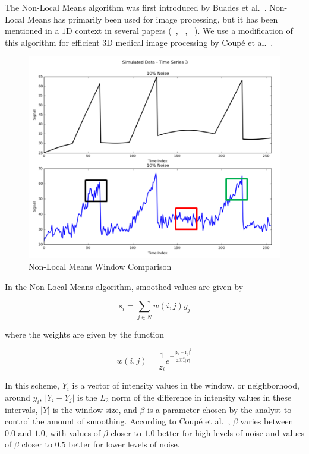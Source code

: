 \documentclass[11pt]{article}
\theoremstyle{definition}
\begin{document}
The Non-Local Means algorithm was first introduced by Buades et al.~\cite{Buades05}. Non-Local Means has primarily been used for image processing, but it has been mentioned in a $1$D context in several papers (~\cite{Galiano13}, ~\cite{Tracey12}, ~\cite{Zoican10}). We use a modification of this algorithm for efficient $3$D medical image processing by Coup{\'e} et al.~\cite{Coupe07}.

\begin{figure}
\centering
\includegraphics[width = 0.65 \textwidth]{NLMeansDemo.png}
\caption{Non-Local Means Window Comparison}
\label{nlmeansdemo}
\end{figure}

In the Non-Local Means algorithm, smoothed values are given by

\begin{displaymath}
s_i = \sum _{j \in N} w \left(i, j \right) y_j
\end{displaymath}

\noindent
where the weights are given by the function

\begin{displaymath}
w \left(i, j \right) = \frac{1}{z_i} e^{-\frac{\lvert Y_i - Y_j \rvert ^2}{2 \beta \hat{\sigma}^2_n \lvert Y \rvert}}
\end{displaymath}

In this scheme, $Y_i$ is a vector of intensity values in the window, or neighborhood, around $y_i$, $\lvert Y_i - Y_j \rvert$ is the $L_2$ norm of the difference in intensity values in these intervals, $\lvert Y \rvert$ is the window size, and $\beta$ is a parameter chosen by the analyst to control the amount of smoothing. According to Coup{\'e} et al.~\cite{Coupe07}, $\beta$ varies between $0.0$ and $1.0$, with values of $\beta$ closer to $1.0$ better for high levels of noise and values of $\beta$ closer to $0.5$ better for lower levels of noise.
\end{document}
